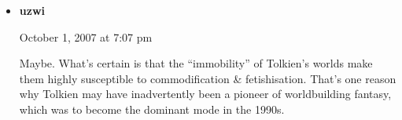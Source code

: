 \documentclass[14pt]{extarticle}
\begin{document}
\begin{itemize}[leftmargin=*]
\item \textbf{uzwi}

October 1, 2007 at 7:07 pm

Maybe. What’s certain is that the “immobility” of Tolkien’s worlds make them highly susceptible to commodification \& fetishisation. That’s one reason why Tolkien may have inadvertently been a pioneer of worldbuilding fantasy, which was to become the dominant mode in the 1990s.

\end{itemize}
\end{document}
